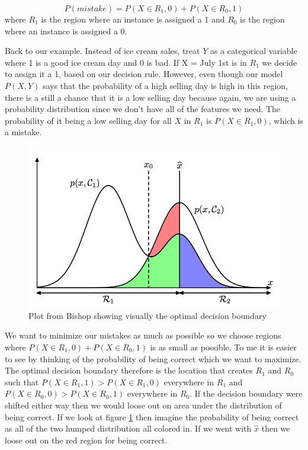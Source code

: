 \documentclass[paper=a4, fontsize=11pt]{scrartcl} %
\numberwithin{equation}{section} %
\numberwithin{figure}{section} %
\numberwithin{table}{section} %
\begin{document}
\begin{equation}
P(mistake) = P(X\in R_1, 0) + P(X\in R_0, 1)
\end{equation}
where $R_1$ is the region where an instance is assigned a 1 and $R_0$ is the region where an instance is assigned a 0.

Back to our example. Instead of ice cream sales, treat $Y$ as a categorical variable where 1 is a good ice cream day and 0 is bad.  If X = July 1st is in $R_1$ we decide to assign it a 1, based on our decision rule. However, even though our model $P(X,Y)$ says that the probability of a high selling day is high in this region, there is a still a chance that it is a low selling day because again, we are using a probability distribution since we don't have all of the features we need. The probability of it being a low selling day for all $X$ in $R_1$ is $P(X\in R_1, 0)$, which is a mistake.

 \begin{figure}[t] \label{fig:bishop_optimal_distributions}
\caption{Plot from Bishop showing visually the optimal decision boundary}
\centering
 \includegraphics[scale=.7]{bishop_optimal_distributions.png}
 \end{figure}
 
We want to minimize our mistakes as much as possible so we choose regions where $P(X\in R_1, 0) + P(X\in R_0, 1)$ is as small as possible. To me it is easier to see by thinking of the probability of being correct which we want to maximize. The optimal decision boundary therefore is the location that creates $R_1$ and $R_0$ such that $P(X\in R_1, 1) >  P(X\in R_1, 0)$ everywhere in $R_1$ and $P(X\in R_0, 0) >  P(X\in R_0, 1)$ everywhere in $R_0$. If the decision boundary were shifted either way then we would loose out on area under the distribution of being correct. If we look at figure \ref{fig:bishop_optimal_distributions} then imagine the probability of being correct as all of the two humped distribution all colored in. If we went with $\hat{x}$ then we loose out on the red region for being correct.
\end{document}
